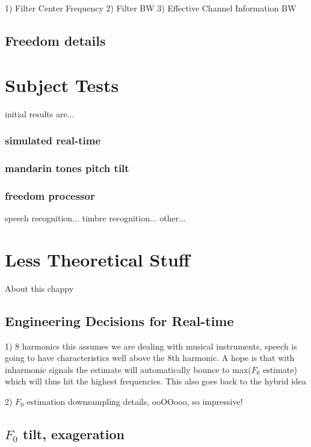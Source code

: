 \documentclass [11pt, proquest] {uwthesis}[2015/03/03]
\begin{document}
1) Filter Center Frequency
2) Filter BW
3) Effective Channel Information BW

\section{Freedom details}


\chapter{Subject Tests}
initial results are...


	\subsection{simulated real-time}
	
	\subsection{mandarin tones pitch tilt}
	
	\subsection{freedom processor}
		speech recognition...
		timbre recognition...
		other...


 
\chapter{Less Theoretical Stuff}

About this chappy

\section{Engineering Decisions for Real-time}

1) 8 harmonics
this assumes we are dealing with musical instruments, speech is going to have characteristics well above the 8th harmonic.  A hope is that with inharmonic signals the estimate will automatically bounce to max($F_0$ estimate) which will thus hit the highest frequencies.  This also goes back to the hybrid idea


2) $F_0$ estimation downsampling details, ooOOooo, so impressive!

\section{$F_0$ tilt, exageration}
\end{document}
